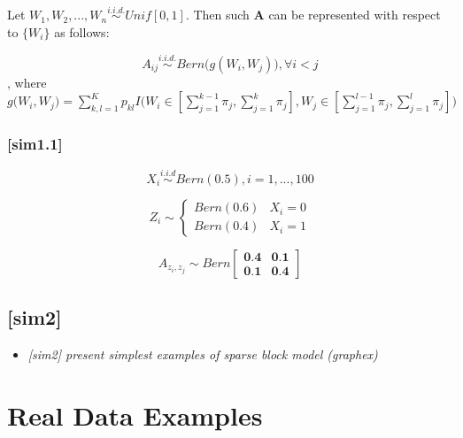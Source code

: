 \documentclass[12pt]{article}
\theoremstyle{definition}
\begin{document}
 Let $W_{1}, W_{2}, ... , W_{n} \overset{i.i.d.}{\sim} Unif[0,1]$. Then such $\mathbf{A}$ can be represented with respect to $\{ W_{i} \}$ as follows:

\begin{equation} 
A_{ij} \overset{i.i.d.}{\sim} Bern \big( g(W_{i}, W_{j})  \big), \forall i < j
\end{equation}
 , where $g\big( W_{i}, W_{j} \big) = \sum\limits_{k,l=1}^{K} p_{kl} I \big( W_{i} \in [\sum\limits_{j=1}^{k-1} \pi_{j}, \sum\limits_{j=1}^{k} \pi_{j}   ] , W_{j} \in [\sum\limits_{j=1}^{l-1} \pi_{j}, \sum\limits_{j=1}^{l} \pi_{j}  ]  \big)$


\subsubsection{[sim1.1]}

\begin{equation}
X_{i} \overset{i.i.d}{\sim} Bern(0.5), i = 1,... , 100
\end{equation}

\begin{equation}
Z_{i}  \sim  \left\{  \begin{array}{cc} Bern(0.6) & X_{i} = 0 \\ Bern(0.4) & X_{i} = 1  \end{array} \right.
\end{equation}

\begin{equation}
A_{z_{i}, z_{j}} \sim Bern \left[  \begin{array}{cc}   \textbf{0.4} & \textbf{0.1}  \\ \textbf{0.1} & \textbf{0.4} \end{array}  \right]
\end{equation}




\subsection{[sim2]}
\begin{itemize}
	\item {\it  [sim2] present simplest examples of sparse block model (graphex) \/}
\end{itemize}

\newpage
\section{Real Data Examples}
\end{document}

